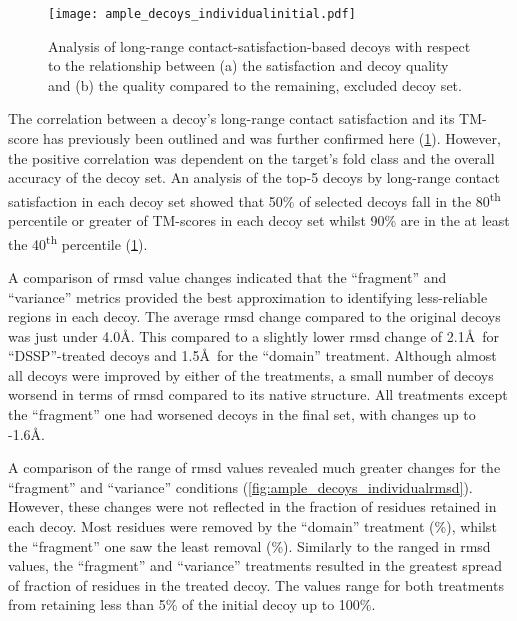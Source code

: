 \begin{figure}[H]
	\centering
	\texttt{[image: ample\_decoys\_individualinitial.pdf]}
        \caption[Selection of single decoys by long-range satisfaction]{Analysis of long-range contact-satisfaction-based decoys with respect to the relationship between (a) the satisfaction and decoy quality and (b) the quality compared to the remaining, excluded decoy set.}
	\label{fig:ample_decoys_individualinitial}
\end{figure}

The correlation between a decoy's long-range contact satisfaction and its TM-score has previously been outlined and was further confirmed here (\cref{fig:ample_decoys_individualinitial}). However, the positive correlation was dependent on the target's fold class and the overall accuracy of the decoy set. An analysis of the top-5 decoys by long-range contact satisfaction in each decoy set showed that 50\% of selected decoys fall in the 80\textsuperscript{th} percentile or greater of TM-scores in each decoy set whilst 90\% are in the at least the 40\textsuperscript{th} percentile (\cref{fig:ample_decoys_individualinitial}). 

A comparison of \gls{rmsd} value changes indicated that the ``fragment'' and ``variance'' metrics provided the best approximation to identifying less-reliable regions in each decoy. The average \gls{rmsd} change compared to the original decoys was just under 4.0\AA. This compared to a slightly lower \gls{rmsd} change of 2.1\AA\ for ``DSSP''-treated decoys and 1.5\AA\ for the ``domain'' treatment. Although almost all decoys were improved by either of the treatments, a small number of decoys worsend in terms of \gls{rmsd} compared to its native structure. All treatments except the ``fragment'' one had worsened decoys in the final set, with changes up to -1.6\AA. 

A comparison of the range of \gls{rmsd} values revealed much greater changes for the ``fragment'' and ``variance'' conditions (\cref{fig:ample_decoys_individualrmsd}). However, these changes were not reflected in the fraction of residues retained in each decoy. Most residues were removed by the ``domain'' treatment (\%), whilst the ``fragment'' one saw the least removal (\%). Similarly to the ranged in \gls{rmsd} values, the ``fragment'' and ``variance'' treatments resulted in the greatest spread of fraction of residues in the treated decoy. The values range for both treatments from retaining less than 5\% of the initial decoy up to 100\%.

